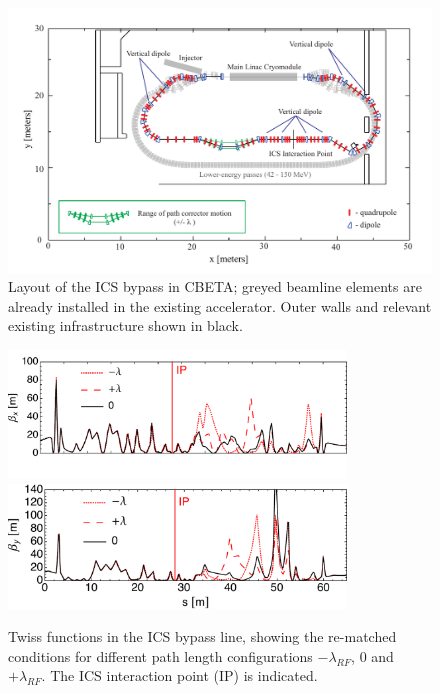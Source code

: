\documentclass[../main.tex]{subfiles}
\begin{document}
\begin{figure}[!htb]
\centering
\includegraphics[width=\textwidth]{Figures/CBETA_Inverse_Compton_Source_Design/cbetaicslayout.pdf}
\caption{Layout of the ICS bypass in CBETA; greyed beamline elements are already installed in the existing accelerator. Outer walls and relevant existing infrastructure shown in black.}
\label{fig:CBETA_ICS_Layout}
\end{figure}

\begin{figure}[!htb]
    \centering
    \includegraphics[width=0.8\textwidth]{Figures/CBETA_Inverse_Compton_Source_Design/twissplotx.pdf}
    \includegraphics[width=0.8\textwidth]{Figures/CBETA_Inverse_Compton_Source_Design/twissploty.pdf}
    \caption{Twiss functions in the ICS bypass line, showing the re-matched conditions for different path length configurations $-\lambda_{RF}$, $0$ and $+\lambda_{RF}$. The ICS interaction point (IP) is indicated.}
    \label{fig:CBETA_ICS_Twiss}
\end{figure}
\end{document}
